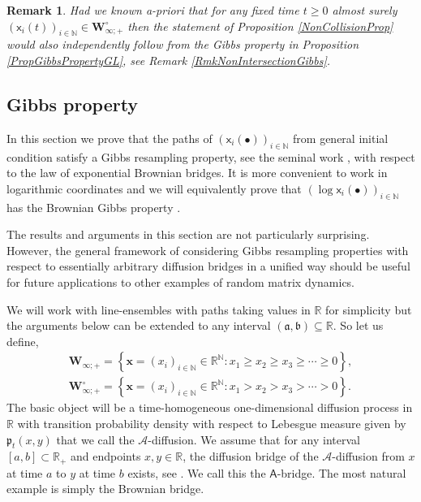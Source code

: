 \documentclass[]{article}
\newtheorem{rmk}[thm]{Remark}
\begin{document}
\begin{rmk}\label{RmkGibbsInitial}
Had we known a-priori that for any fixed time $t \ge 0$ almost surely $(\mathsf{x}_i(t))_{i \in \mathbb{N}}\in \mathbf{W}_{\infty;+}^\circ$ then the statement of Proposition \ref{NonCollisionProp} would also independently follow from the Gibbs property in Proposition \ref{PropGibbsPropertyGL}, see Remark \ref{RmkNonIntersectionGibbs}.
\end{rmk}

\subsection{Gibbs property}\label{SubsectionGibbs}

In this section we prove that the paths of $(\mathsf{x}_i(\bullet))_{i\in \mathbb{N}}$ from general initial condition satisfy a Gibbs resampling property, see the seminal work \cite{CorwinHammond1}, with respect to the law of exponential Brownian bridges. It is more convenient to work in logarithmic coordinates and we will equivalently prove that $(\log \mathsf{x}_i(\bullet))_{i\in \mathbb{N}}$ has the Brownian Gibbs property \cite{CorwinHammond1}.

The results and arguments in this section are not particularly surprising. However, the general framework of considering Gibbs resampling properties with respect to essentially arbitrary diffusion bridges in a unified way should be useful for future applications to other examples of random matrix dynamics.

We will work with line-ensembles with paths taking values in $\mathbb{R}$ for simplicity but the arguments below can be extended to any interval $(\mathfrak{a},\mathfrak{b})\subseteq \mathbb{R}$. So let us define,
\begin{align*}
\mathbf{W}_{\infty;+}=\left\{\mathbf{x}=(x_i)_{i\in \mathbb{N}}\in \mathbb{R}^{\mathbb{N}}:x_1\ge x_2\ge x_3 \ge \cdots \ge 0\right\},\\
\mathbf{W}_{\infty;+}^\circ=\left\{\mathbf{x}=(x_i)_{i\in \mathbb{N}}\in \mathbb{R}^{\mathbb{N}}:x_1> x_2> x_3 > \cdots >0\right\}.
\end{align*}
The basic object will be a time-homogeneous one-dimensional diffusion process in $\mathbb{R}$ with transition probability density with respect to Lebesgue measure given by $\mathfrak{p}_t(x,y)$ that we call the $\mathscr{A}$-diffusion. We assume that for any interval $[a,b]\subset \mathbb{R}_+$ and endpoints $x,y \in \mathbb{R}$, the diffusion bridge of the $\mathscr{A}$-diffusion from $x$ at time $a$ to $y$ at time $b$ exists, see \cite{MarkovianBridgers}. We call this the $\mathsf{A}$-bridge. The most natural example is simply the Brownian bridge. %
\end{document}
